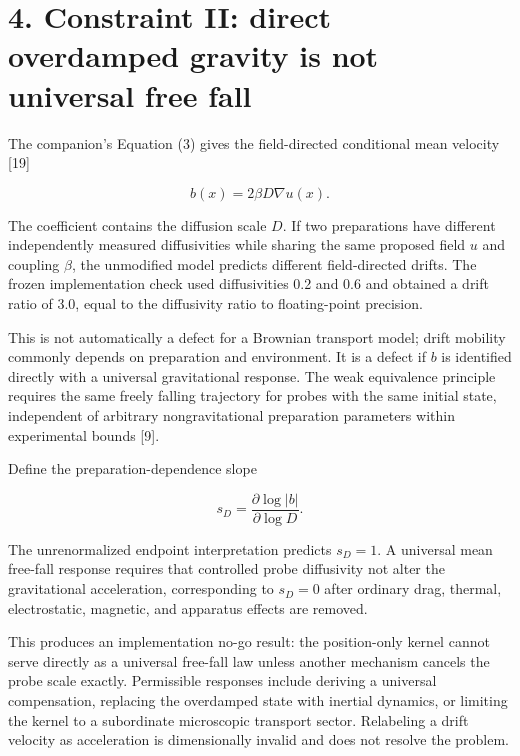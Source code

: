 \documentclass[
  american,
  11pt,
  letterpaper,
]{article}
\begin{document}
\section{4. Constraint II: direct overdamped gravity is not universal free fall}\label{constraint-ii-direct-overdamped-gravity-is-not-universal-free-fall}

The companion's Equation (3) gives the field-directed conditional mean velocity {[}19{]}

\begin{equation}
b(x)=2\beta D\nabla u(x).
\tag{6}
\end{equation}

The coefficient contains the diffusion scale \(D\). If two preparations have different independently measured diffusivities while sharing the same proposed field \(u\) and coupling \(\beta\), the unmodified model predicts different field-directed drifts. The frozen implementation check used diffusivities 0.2 and 0.6 and obtained a drift ratio of 3.0, equal to the diffusivity ratio to floating-point precision.

This is not automatically a defect for a Brownian transport model; drift mobility commonly depends on preparation and environment. It is a defect if \(b\) is identified directly with a universal gravitational response. The weak equivalence principle requires the same freely falling trajectory for probes with the same initial state, independent of arbitrary nongravitational preparation parameters within experimental bounds {[}9{]}.

Define the preparation-dependence slope

\begin{equation}
s_D=\frac{\partial\log|b|}{\partial\log D}.
\tag{7}
\end{equation}

The unrenormalized endpoint interpretation predicts \(s_D=1\). A universal mean free-fall response requires that controlled probe diffusivity not alter the gravitational acceleration, corresponding to \(s_D=0\) after ordinary drag, thermal, electrostatic, magnetic, and apparatus effects are removed.

This produces an implementation no-go result: the position-only kernel cannot serve directly as a universal free-fall law unless another mechanism cancels the probe scale exactly. Permissible responses include deriving a universal compensation, replacing the overdamped state with inertial dynamics, or limiting the kernel to a subordinate microscopic transport sector. Relabeling a drift velocity as acceleration is dimensionally invalid and does not resolve the problem.
\end{document}

